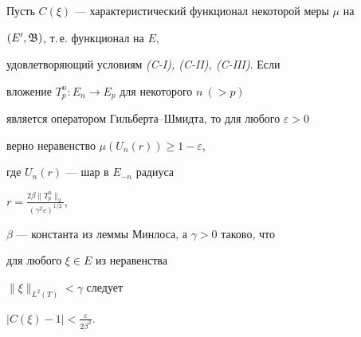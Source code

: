 \begin{lem}\label{mx010}


Пусть $C(\xi)$ --- характеристический функционал некоторой меры $\mu$ на


$(E',\frak{B})$, т.\,е. функционал на $E$,


удовлетворяющий условиям {\em (C-I), (C-II), (C-III)}. Если


вложение $T_p^n:E_n\to E_p$ для некоторого $n\ (>p)$ 


является оператором Гильберта--Шмидта, то для любого $\varepsilon>0$


верно неравенство $\mu(U_n(r))\geq 1-\varepsilon$,


где $U_n(r)$ --- шар в $E_{-n}$ радиуса


$r=\frac{2\beta\|T_p^n\|_2}{(\gamma^2\varepsilon)^{1/2}}$,\linebreak


$\beta$ --- константа из леммы Минлоса, а $\gamma>0$ таково, что


для любого $\xi\in E$ из неравенства


$\|\xi\|_{L^2(T)}<\gamma$ следует


$|C(\xi)-1|<\frac{\varepsilon}{2\beta^2}$.


\end{lem}






